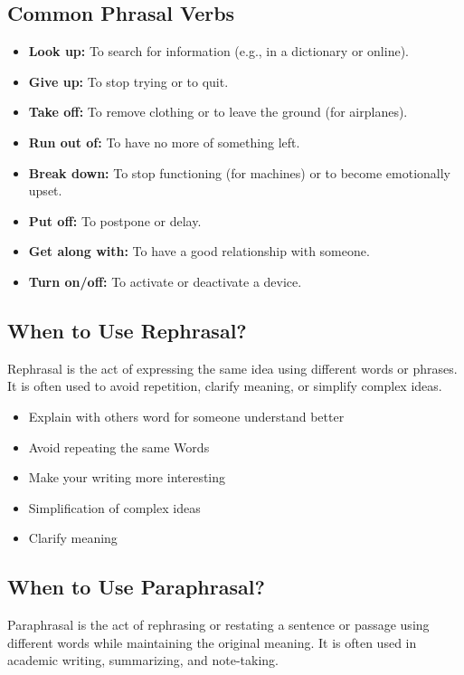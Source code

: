 \subsection{Common Phrasal Verbs}
\begin{itemize}
    \item \textbf{Look up:} To search for information (e.g., in a dictionary or online).
    \item \textbf{Give up:} To stop trying or to quit.
    \item \textbf{Take off:} To remove clothing or to leave the ground (for airplanes).
    \item \textbf{Run out of:} To have no more of something left.
    \item \textbf{Break down:} To stop functioning (for machines) or to become emotionally upset.
    \item \textbf{Put off:} To postpone or delay.
    \item \textbf{Get along with:} To have a good relationship with someone.
    \item \textbf{Turn on/off:} To activate or deactivate a device.
\end{itemize}

\subsection{When to Use Rephrasal?}

Rephrasal is the act of expressing the same idea using different words or phrases. It is often used to avoid repetition, clarify meaning, or simplify complex ideas.

\begin{itemize}
    \item Explain with others word for someone understand better
    \item Avoid repeating the same Words
    \item Make your writing more interesting
    \item Simplification of complex ideas
    \item Clarify meaning
\end{itemize}

\subsection{When to Use Paraphrasal?}

Paraphrasal is the act of rephrasing or restating a sentence or passage using different words while maintaining the original meaning. It is often used in academic writing, summarizing, and note-taking.

